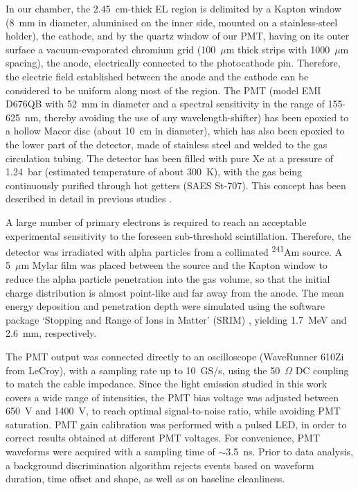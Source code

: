 \documentclass[%
 reprint,
superscriptaddress,
 amsmath,amssymb,
 aps,
]{revtex4-2}
\begin{document}
In our chamber, the 2.45~cm-thick EL region is delimited by a Kapton window (8~mm in diameter, aluminised on the inner side, mounted on a stainless-steel holder), the cathode, and by the quartz window of our PMT, having on its outer surface a vacuum-evaporated chromium grid (100~$\mu$m thick  strips with 1000~$\mu$m spacing), the anode, electrically connected to the photocathode pin. Therefore, the electric field established between the anode and the cathode can be considered to be uniform along most of the region. The PMT (model EMI D676QB with 52~mm in diameter and a spectral sensitivity in the range of 155-625~nm, thereby avoiding the use of any wavelength-shifter) has been epoxied to a hollow Macor disc (about 10~cm in diameter), which has also been epoxied to the lower part of the detector, made of stainless steel and welded to the gas circulation tubing. The detector has been filled with pure Xe at a pressure of 1.24~bar (estimated temperature of about 300~K), with the gas being continuously purified through hot getters (SAES St‐707). This concept has been described in detail in previous studies \cite{42,44}.

A large number of primary electrons is required to reach an acceptable experimental sensitivity to the foreseen sub-threshold scintillation. Therefore, the detector was irradiated with alpha particles from a collimated \textsuperscript{241}Am source. A 5~$\mu$m Mylar film was placed between the source and the Kapton window to reduce the alpha particle penetration into the gas volume, so that the initial charge distribution is almost point-like and far away from the anode. The mean energy deposition and penetration depth were simulated using the software package `Stopping and Range of Ions in Matter' (SRIM) \cite{45}, yielding 1.7~MeV and 2.6~mm, respectively.   

The PMT output was connected directly to an oscilloscope (WaveRunner 610Zi from LeCroy), with a sampling rate up to 10~GS/s, using the 50~$\Omega$ DC coupling to match the cable impedance. Since the light emission studied in this work covers a wide range of intensities, the PMT bias voltage was adjusted between 650~V and 1400~V, to reach optimal signal-to-noise ratio, while avoiding PMT saturation. PMT gain calibration was performed with a pulsed LED, in order to correct results obtained at different PMT voltages. For convenience, PMT waveforms were acquired with a sampling time of $\sim$3.5~ns. Prior to data analysis, a background discrimination algorithm rejects events based on waveform duration, time offset and shape, as well as on baseline cleanliness.
\end{document}
